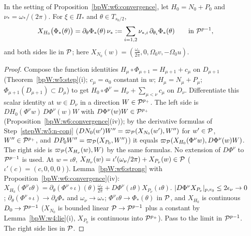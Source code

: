 \begin{proposition}\label{bpW:w6:invariance}
In the setting of Proposition~\ref{bpW:w6:convergence}, let $H_0=N_0+P_0$ and $\nu_*=\omega_*/(2\pi)$. For $\xi\in\Pi_*$ and
$\theta\in T_{s_0/2}$,
\[X_{H_0}\bigl(\Phi_*(\theta)\bigr)=\partial_\theta\Phi_*(\theta)\,\nu_*:=\sum_{i=1,2}\nu_{*,i}\,\partial_{\theta_i}\Phi_*(\theta)\qquad\text{in }\mathcal P^{p-1},\]
and both sides lie in $\mathcal P$; here $X_{N_0}(w)=(\frac{\omega_0}{2\pi},0,\Omega_0v,-\Omega_0u)$.
\end{proposition}
\begin{proof}
\label{stepW:w6:i-weak} Compose the function identities $H_\mu\circ\Phi_{\mu+1}=H_{\mu+1}+c_\mu$ on
$D_{\mu+1}$ (Theorem~\ref{bpW:w5:step}(i); $c_\mu=\hat a_0$ constant in $w$; $H_\mu=N_\mu+P_\mu$; $\Phi_{\mu+1}(D_{\mu+1})\subset D_\mu$) to
get $H_0\circ\Phi^\nu=H_\nu+\sum_{\mu<\nu}c_\mu$ on $D_\nu$. Differentiate this scalar identity at $w\in D_\nu$ in a direction
$W\in\mathcal P^{p_+}$. The left side is $DH_0(\Phi^\nu w)\,D\Phi^\nu(w)W$ with $D\Phi^\nu(w)W\in\mathcal P^{p_+}$
(Proposition~\ref{bpW:w6:convergence}(iv)); by the derivative formulas of Step~\ref{stepW:w5:n-conj}
($DN_0(w')W''=\varpi_{\mathcal P}(X_{N_0}(w'),W'')$ for $w'\in\mathcal P$, $W''\in\mathcal P^{p_+}$, and $DP_0W''=\varpi_{\mathcal P}(X_{P_0},W'')$) it equals
$\varpi_{\mathcal P}(X_{H_0}(\Phi^\nu w),D\Phi^\nu(w)W)$. The right side is $\varpi_{\mathcal P}(X_{H_\nu}(w),W)$ by the same formulas. No extension of
$D\Phi^\nu$ to $\mathcal P^{p-1}$ is used.
\label{stepW:w6:i-torus} At $w=\iota\theta$, $X_{H_\nu}(w)=\iota'(\omega_\nu/2\pi)+X_{P_\nu}(w)\in\mathcal P$
($\iota'(c)=(c,0,0,0)$). Lemma~\ref{bpW:w6:strong} with Proposition~\ref{bpW:w6:convergence}(iv):
$X_{H_0}(\Phi^\nu\iota\theta)=\partial_\theta(\Phi^\nu\circ\iota)(\theta)\frac{\omega_\nu}{2\pi}+D\Phi^\nu(\iota\theta)X_{P_\nu}(\iota\theta)$.
\label{stepW:w6:i-lim} $\lvert D\Phi^\nu X_{P_\nu}\rvert_{p,r_0}\le2\epsilon_\nu\to0$; $\partial_\theta(\Phi^\nu\circ\iota)\to\partial_\theta\Phi_*$ and
$\omega_\nu\to\omega_*$; $\Phi^\nu\iota\theta\to\Phi_*(\theta)$ in $\mathcal P$, and $X_{H_0}$ is continuous $D_0\to\mathcal P^{p-1}$ ($X_{N_0}$ is bounded linear
$\mathcal P\to\mathcal P^{p-1}$ plus a constant by Lemma~\ref{bpW:w4:lie}(i), $X_{P_0}$ is continuous into $\mathcal P^{p_+}$). Pass to the limit in
$\mathcal P^{p-1}$. The right side lies in $\mathcal P$.
\end{proof}

